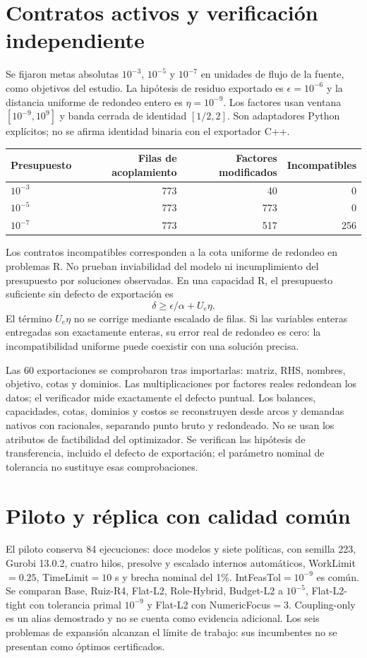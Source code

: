 \documentclass[10pt,a4paper]{article}
\begin{document}
\section{Contratos activos y verificación independiente}
Se fijaron metas absolutas $10^{-3}$, $10^{-5}$ y $10^{-7}$ en unidades de flujo
de la fuente, como objetivos del estudio. La hipótesis de residuo exportado es
$\epsilon=10^{-6}$ y la distancia uniforme de redondeo entero es
$\eta=10^{-9}$. Los factores usan ventana $[10^{-9},10^9]$ y banda cerrada
de identidad $[1/2,2]$. Son adaptadores Python explícitos; no se afirma identidad
binaria con el exportador C++.

\begin{center}\small
\begin{tabular}{lrrr}\toprule
Presupuesto&Filas de acoplamiento&Factores modificados&Incompatibles\\\midrule
$10^{-3}$&773&40&0\\
$10^{-5}$&773&773&0\\
$10^{-7}$&773&517&256\\\bottomrule
\end{tabular}
\end{center}
Los contratos incompatibles corresponden a la cota uniforme de redondeo en
problemas R. No prueban inviabilidad del modelo ni incumplimiento del presupuesto
por soluciones observadas. En una capacidad R, el presupuesto suficiente sin
defecto de exportación es
\[
 \delta\ge\epsilon/\alpha+U_e\eta.
\]
El término $U_e\eta$ no se corrige mediante escalado de filas. Si las variables
enteras entregadas son exactamente enteras, su error real de redondeo es cero:
la incompatibilidad uniforme puede coexistir con una solución precisa.

Las 60 exportaciones se comprobaron tras importarlas: matriz, RHS, nombres,
objetivo, cotas y dominios. Las multiplicaciones por factores reales redondean
los datos; el verificador mide exactamente el defecto puntual. Los balances,
capacidades, cotas, dominios y costos se reconstruyen desde arcos y demandas
nativos con racionales, separando punto bruto y redondeado. No se usan los
atributos de factibilidad del optimizador. Se verifican las hipótesis de
transferencia, incluido el defecto de exportación; el parámetro nominal de
tolerancia no sustituye esas comprobaciones.

\section{Piloto y réplica con calidad común}
El piloto conserva 84 ejecuciones: doce modelos y siete políticas, con semilla
223, Gurobi 13.0.2, cuatro hilos, presolve y escalado internos automáticos,
WorkLimit$=0.25$, TimeLimit$=10$ s y brecha nominal del 1\%.
IntFeasTol$=10^{-9}$ es común. Se comparan Base, Ruiz-R4, Flat-L2,
Role-Hybrid, Budget-L2 a $10^{-5}$, Flat-L2-tight con tolerancia primal
$10^{-9}$ y Flat-L2 con NumericFocus$=3$.
Coupling-only es un alias demostrado y no se cuenta como evidencia adicional.
Los seis problemas de expansión alcanzan el límite de trabajo: sus incumbentes
no se presentan como óptimos certificados.
\end{document}
